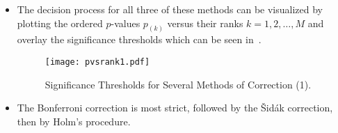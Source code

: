 \begin{itemize}
    \item The decision process for all three of these methods can be visualized by plotting the ordered $p$-values
          $ p_{(k)} $ versus their ranks $ k=1,2,\ldots,M $ and overlay the significance thresholds which can
          be seen in~.
          \begin{figure}[!htbp]
              \centering
              \texttt{[image: pvsrank1.pdf]}
              \caption{Significance Thresholds for Several Methods of Correction (1).}\label{fig:pvsrank1}
          \end{figure}
    \item The Bonferroni correction is most strict, followed by the Šidák correction, then by Holm's procedure.
\end{itemize}
